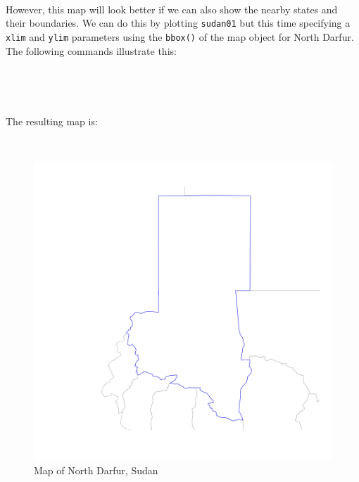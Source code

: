 \documentclass[12pt,a4paper,a4paper]{book}
\newenvironment{Shaded}{\begin{snugshade}}{\end{snugshade}}
\newcommand{\KeywordTok}[1]{\textcolor[rgb]{0.13,0.29,0.53}{\textbf{#1}}}
\newcommand{\DataTypeTok}[1]{\textcolor[rgb]{0.13,0.29,0.53}{#1}}
\newcommand{\DecValTok}[1]{\textcolor[rgb]{0.00,0.00,0.81}{#1}}
\newcommand{\StringTok}[1]{\textcolor[rgb]{0.31,0.60,0.02}{#1}}
\newcommand{\OtherTok}[1]{\textcolor[rgb]{0.56,0.35,0.01}{#1}}
\newcommand{\OperatorTok}[1]{\textcolor[rgb]{0.81,0.36,0.00}{\textbf{#1}}}
\newcommand{\NormalTok}[1]{#1}
\theoremstyle{definition}
\theoremstyle{definition}
\theoremstyle{definition}
\theoremstyle{remark}
\begin{document}
~

However, this map will look better if we can also show the nearby states
and their boundaries. We can do this by plotting \texttt{sudan01} but
this time specifying a \texttt{xlim} and \texttt{ylim} parameters using
the \texttt{bbox()} of the map object for North Darfur. The following
commands illustrate this:

~

\begin{Shaded}
\end{Shaded}

~

The resulting map is:

~

\begin{figure}[H]

{\centering \includegraphics{figures/map13-1} 

}

\caption{Map of North Darfur, Sudan}\label{fig:map13}
\end{figure}
\end{document}
